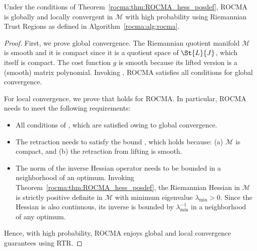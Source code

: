 				
	
				
				
\begin{thm}\label{rocma:thm:ROCMA_convergence}
	Under the conditions of Theorem~\ref{rocma:thm:ROCMA_hess_posdef}, ROCMA is globally and locally convergent in $\mathcal{M}$ with high probability using Riemannian Trust Regions as defined in Algorithm~\ref{rocma:alg:rocma}.
\end{thm}
\begin{proof}
	First, we prove global convergence. The Riemannian quotient manifold $\mathcal{M}$ is smooth and it is compact since it is a quotient space of $\St{L}{J}$, which itself is compact. The cost function $g$ is smooth because its lifted version is a (smooth) matrix polynomial. Invoking \cite[Corollary 4.6]{Absil2007trustregions}, ROCMA satisfies all conditions for global convergence.
	
	For local convergence, we prove that \cite[Theorem 4.12]{Absil2007trustregions} holds for ROCMA. In particular, ROCMA needs to meet the following requirements:
	\begin{itemize}
		\item All conditions of \cite[Theorem 4.2]{Absil2007trustregions}, which are satisfied owing to global convergence.
		\item The retraction needs to satisfy the bound \cite[Eq.(18)]{Absil2007trustregions}, which holds because: (a) $\mathcal{M}$ is compact, and (b) the retraction 
		from lifting is smooth.
		\item The norm of the inverse Hessian operator needs to be bounded in a neighborhood of an optimum. Invoking Theorem~\ref{rocma:thm:ROCMA_hess_posdef}, the Riemannian Hessian in $\mathcal{M}$ is strictly positive definite in $\mathcal{M}$ with minimum eigenvalue $\lambda_{\mathrm{min}}>0$. Since the Hessian is also continuous, its inverse is bounded by $\lambda_{\mathrm{min}}^{-1}$ in a neighborhood of any optimum.
	\end{itemize}
	Hence, with high probability, ROCMA enjoys global and local convergence guarantees using RTR.
\end{proof}
				
